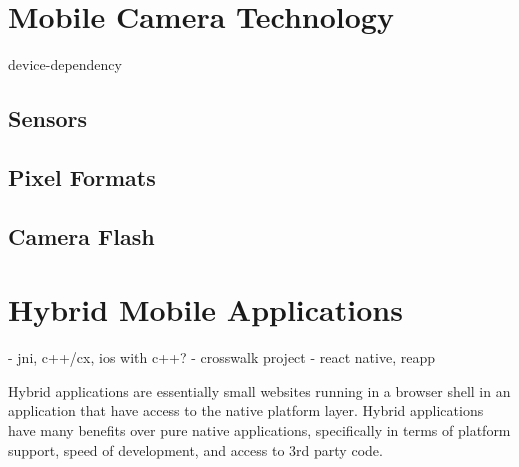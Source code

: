 \documentclass[thesis.tex]{subfiles}
\begin{document}
\section{Mobile Camera Technology}
device-dependency
\subsection{Sensors}
\subsection{Pixel Formats}
\subsection{Camera Flash}

\section{Hybrid Mobile Applications}
- jni, c++/cx, ios with c++?
- crosswalk project
- react native, reapp

Hybrid applications are essentially small websites running in a browser shell in an application that have access to the native platform layer. Hybrid applications have many benefits over pure native applications, specifically in terms of platform support, speed of development, and access to 3rd party code.
\end{document}
